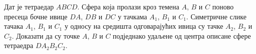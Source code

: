 Дат је тетраедар $ABCD$.
Сфера која пролази кроз темена $A$, $B$ и $C$ поново пресеца бочне ивице $DA$,
$DB$ и $DC$ у тачкама $A_1$, $B_1$ и $C_1$.
Симетричне слике тачака $A_1$, $B_1$ и $C_1$ у односу на средишта одговарајућих
ивица су тачке $A_2$, $B_2$ и $C_2$.
Доказати да су точке $A$, $B$ и $C$ подједнако удаљене од центра описане сфере
тетраедра $D A_2 B_2 C_2$. 

\solution

